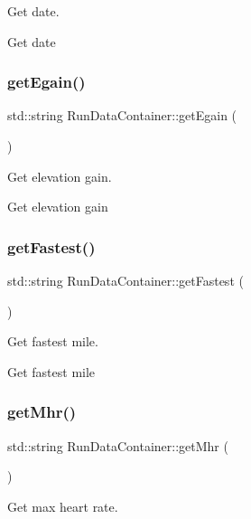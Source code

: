 Get date. 

Get date \mbox{\label{classRunDataContainer_a388bf5b9126f25d0a684a7d6e488390d}} 
\subsubsection{\texorpdfstring{getEgain()}{getEgain()}}
{\footnotesize\ttfamily std\+::string Run\+Data\+Container\+::get\+Egain (\begin{DoxyParamCaption}{ }\end{DoxyParamCaption})}



Get elevation gain. 

Get elevation gain \mbox{\label{classRunDataContainer_afeb2371897072dd87a6eeafd3012c11b}} 
\subsubsection{\texorpdfstring{getFastest()}{getFastest()}}
{\footnotesize\ttfamily std\+::string Run\+Data\+Container\+::get\+Fastest (\begin{DoxyParamCaption}{ }\end{DoxyParamCaption})}



Get fastest mile. 

Get fastest mile \mbox{\label{classRunDataContainer_ac1b5ca00fdaa39a45b2a941512fda6b0}} 
\subsubsection{\texorpdfstring{getMhr()}{getMhr()}}
{\footnotesize\ttfamily std\+::string Run\+Data\+Container\+::get\+Mhr (\begin{DoxyParamCaption}{ }\end{DoxyParamCaption})}



Get max heart rate. 

